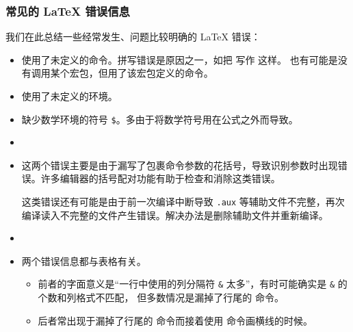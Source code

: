 \subsubsection{常见的 \LaTeX{} 错误信息}

我们在此总结一些经常发生、问题比较明确的 \LaTeX{} 错误：

\long{}

\begin{itemize}
\item {}

使用了未定义的命令。拼写错误是原因之一，如把  写作  这样。
也有可能是没有调用某个宏包，但用了该宏包定义的命令。

\item {}

使用了未定义的环境。

\item {}

缺少数学环境的符号 \texttt\$。多由于将数学符号用在公式之外而导致。

\item {}

\item {}

这两个错误主要是由于漏写了包裹命令参数的花括号，导致识别参数时出现错误。许多编辑器的括号配对功能有助于检查和消除这类错误。

这类错误还有可能是由于前一次编译中断导致 \texttt{.aux} 等辅助文件不完整，再次编译读入不完整的文件产生错误。解决办法是删除辅助文件并重新编译。

\item {}

\item {}

两个错误信息都与表格有关。
\begin{itemize}
  \item 前者的字面意义是“一行中使用的列分隔符 \texttt\& 太多”，有时可能确实是 \texttt\& 的个数和列格式不匹配，
  但多数情况是漏掉了行尾的 \crcmd{} 命令。
  \item 后者常出现于漏掉了行尾的 \crcmd{} 命令而接着使用  命令画横线的时候。
\end{itemize}


\end{itemize}
